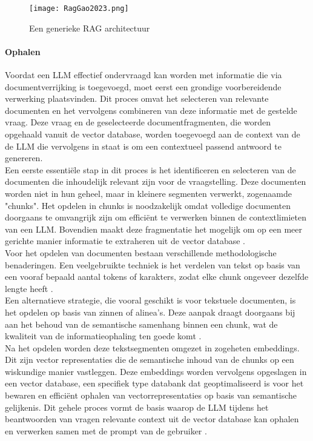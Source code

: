 \begin{figure}[H]
    \centering
    \texttt{[image: RagGao2023.png]}
    \caption{Een generieke RAG architectuur \autocite{gao2024retrievalaugmentedgenerationlargelanguage}}
    \label{fig:Rag process}
\end{figure}

\paragraph{Ophalen}
 
Voordat een LLM effectief ondervraagd kan worden met informatie die via documentverrijking is toegevoegd, moet eerst een grondige voorbereidende verwerking plaatsvinden. Dit proces omvat het selecteren van relevante documenten en het vervolgens combineren van deze informatie met de gestelde vraag. Deze vraag en de geselecteerde documentfragmenten, die worden opgehaald vanuit de vector database, worden toegevoegd aan de context van de de LLM die vervolgens in staat is om een contextueel passend antwoord te genereren.
\\[1em]
Een eerste essentiële stap in dit proces is het identificeren en selecteren van de documenten die inhoudelijk relevant zijn voor de vraagstelling. Deze documenten worden niet in hun geheel, maar in kleinere segmenten verwerkt, zogenaamde "chunks". 
Het opdelen in chunks is noodzakelijk omdat volledige documenten doorgaans te omvangrijk zijn om efficiënt te verwerken binnen de contextlimieten van een LLM. Bovendien maakt deze fragmentatie het mogelijk om op een meer gerichte manier informatie te extraheren uit de vector database \autocite{wu2025retrievalaugmentedgenerationnaturallanguage}.
\\[1em]
Voor het opdelen van documenten bestaan verschillende methodologische benaderingen. Een veelgebruikte techniek is het verdelen van tekst op basis van een vooraf bepaald aantal tokens of karakters, zodat elke chunk ongeveer dezelfde lengte heeft \autocite{wang2024searchingbestpracticesretrievalaugmented}.
\\[1em]
Een alternatieve strategie, die vooral geschikt is voor tekstuele documenten, is het opdelen op basis van zinnen of alinea's. Deze aanpak draagt doorgaans bij aan het behoud van de semantische samenhang binnen een chunk, wat de kwaliteit van de informatieophaling ten goede komt \autocite{wang2024searchingbestpracticesretrievalaugmented}.
\\[1em]
Na het opdelen worden deze tekstsegmenten omgezet in zogeheten embeddings. Dit zijn vector representaties die de semantische inhoud van de chunks op een wiskundige manier vastleggen. Deze embeddings worden vervolgens opgeslagen in een vector database, een specifiek type databank dat geoptimaliseerd is voor het bewaren en efficiënt ophalen van vectorrepresentaties op basis van semantische gelijkenis.  Dit gehele proces vormt de basis waarop de LLM tijdens het beantwoorden van vragen relevante context uit de vector database kan ophalen en verwerken samen met de prompt van de gebruiker\autocite{wu2025retrievalaugmentedgenerationnaturallanguage} .
